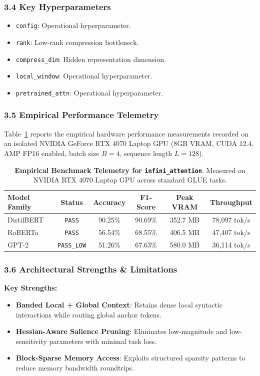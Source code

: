 \subsubsection*{3.4 Key Hyperparameters}
\begin{itemize}
    \item \texttt{config}: Operational hyperparameter.
    \item \texttt{rank}: Low-rank compression bottleneck.
    \item \texttt{compress\_dim}: Hidden representation dimension.
    \item \texttt{local\_window}: Operational hyperparameter.
    \item \texttt{pretrained\_attn}: Operational hyperparameter.
\end{itemize}

\subsubsection*{3.5 Empirical Performance Telemetry}
Table~\ref{tab:telemetry_infini_attention} reports the empirical hardware performance measurements recorded on an isolated NVIDIA GeForce RTX 4070 Laptop GPU (8GB VRAM, CUDA 12.4, AMP FP16 enabled, batch size $B=4$, sequence length $L=128$).

\begin{table}[h]
\centering
\small
\caption{\textbf{Empirical Benchmark Telemetry for \texttt{infini\_attention}}. Measured on NVIDIA RTX 4070 Laptop GPU across standard GLUE tasks.}
\label{tab:telemetry_infini_attention}
\begin{tabular*}{\columnwidth}{@{\extracolsep{\fill}}lccccc}
\toprule
\textbf{Model Family} & \textbf{Status} & \textbf{Accuracy} & \textbf{F1-Score} & \textbf{Peak VRAM} & \textbf{Throughput} \\
\midrule
DistilBERT & \texttt{PASS} & 90.25\% & 90.69\% & 352.7 MB & 78,097 tok/s \\
RoBERTa & \texttt{PASS} & 56.54\% & 68.55\% & 406.5 MB & 47,407 tok/s \\
GPT-2 & \texttt{PASS\_LOW} & 51.26\% & 67.63\% & 580.0 MB & 36,114 tok/s \\
\bottomrule
\end{tabular*}
\end{table}

\subsubsection*{3.6 Architectural Strengths \& Limitations}
\textbf{Key Strengths:}
\begin{itemize}
    \item \textbf{Banded Local + Global Context}: Retains dense local syntactic interactions while routing global anchor tokens.
    \item \textbf{Hessian-Aware Salience Pruning}: Eliminates low-magnitude and low-sensitivity parameters with minimal task loss.
    \item \textbf{Block-Sparse Memory Access}: Exploits structured sparsity patterns to reduce memory bandwidth roundtrips.
\end{itemize}

